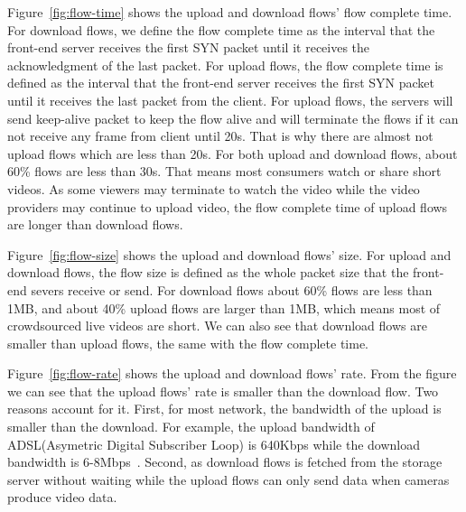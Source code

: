 Figure~\ref{fig:flow-time} shows the upload and download flows' flow complete time. For download flows, we define the flow complete time as the interval that the front-end server receives the first SYN packet until it receives the acknowledgment of the last packet. For upload flows, the flow complete time is defined as the interval that the front-end server receives the first SYN packet until it receives the last packet from the client. For upload flows, the servers will send keep-alive packet to keep the flow alive and will terminate the flows if it can not receive any frame from client until 20s. That is why there are almost not upload flows which are less than 20s. For both upload and download flows, about 60\% flows are less than 30s. That means most consumers watch or share short videos. As some viewers may terminate to watch the video while the video providers may continue to upload video, the flow complete time of upload flows are longer than download flows.   


Figure~\ref{fig:flow-size} shows the upload and download flows' size. For upload and download flows, the flow size is defined as the whole packet size that the front-end severs receive or send. For download flows about 60\% flows are less than 1MB, and about 40\% upload flows are larger than 1MB, which means most of crowdsourced live videos are short. We can also see that download flows are smaller than upload flows, the same with the flow complete time.


Figure~\ref{fig:flow-rate} shows the upload and download flows' rate. From the figure we can see that the upload flows' rate is smaller than the download flow. Two reasons account for it. First, for most network, the bandwidth of the upload is smaller than the download. For example, the upload bandwidth of ADSL(Asymetric Digital Subscriber Loop) is 640Kbps while the download bandwidth is 6-8Mbps~\cite{wei2008classification}. Second, as download flows is fetched from the storage server without waiting while the upload flows can only send data when cameras produce video data. 
